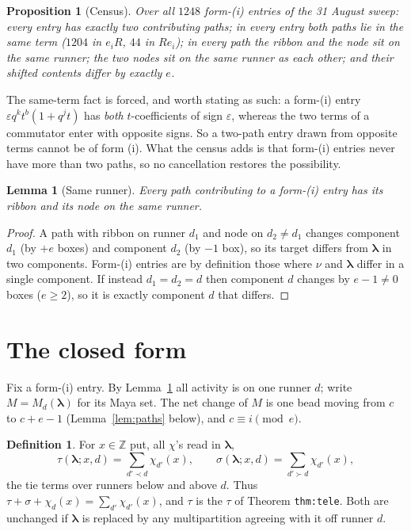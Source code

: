 \documentclass[11pt]{article}
\newtheorem{proposition}[theorem]{Proposition}
\newtheorem{lemma}[theorem]{Lemma}
\theoremstyle{definition}
\newtheorem{definition}[theorem]{Definition}
\theoremstyle{remark}
\newcommand{\Z}{\mathbb{Z}}
\newcommand{\bl}{\boldsymbol{\lambda}}
\begin{document}
\begin{proposition}[Census]\label{prop:census}
Over all $1248$ form-(i) entries of the 31 August sweep: every entry has exactly two
contributing paths; in every entry both paths lie in the same term ($1204$ in $e_iR$,
$44$ in $Re_i$); in every path the ribbon and the node sit on the same runner; the two
nodes sit on the same runner as each other; and their shifted contents differ by exactly
$e$.
\end{proposition}

The same-term fact is forced, and worth stating as such: a form-(i) entry
$\varepsilon q^{k}t^{b}(1+q^{j}t)$ has \emph{both} $t$-coefficients of sign $\varepsilon$,
whereas the two terms of a commutator enter with opposite signs. So a two-path entry
drawn from opposite terms cannot be of form (i). What the census adds is that form-(i)
entries never have more than two paths, so no cancellation restores the possibility.

\begin{lemma}[Same runner]\label{lem:samerunner}
Every path contributing to a form-(i) entry has its ribbon and its node on the same
runner.
\end{lemma}
\begin{proof}
A path with ribbon on runner $d_1$ and node on $d_2\ne d_1$ changes component $d_1$ (by
$+e$ boxes) and component $d_2$ (by $-1$ box), so its target differs from $\bl$ in two
components. Form-(i) entries are by definition those where $\nu$ and $\bl$ differ in a
single component. If instead $d_1=d_2=d$ then component $d$ changes by $e-1\ne0$ boxes
($e\ge2$), so it is exactly component $d$ that differs.
\end{proof}

\section{The closed form}\label{sec:closed}

Fix a form-(i) entry. By Lemma~\ref{lem:samerunner} all activity is on one runner $d$;
write $M=M_d(\bl)$ for its Maya set. The net change of $M$ is one bead moving from $c$
to $c+e-1$ (Lemma~\ref{lem:paths} below), and $c\equiv i \pmod e$.

\begin{definition}\label{def:sigmatau}
For $x\in\Z$ put, all $\chi$'s read in $\bl$,
\[
\tau(\bl;x,d)=\sum_{d'\prec d}\chi_{d'}(x),\qquad
\sigma(\bl;x,d)=\sum_{d'\succ d}\chi_{d'}(x),
\]
the tie terms over runners below and above $d$. Thus
$\tau+\sigma+\chi_d(x)=\sum_{d'}\chi_{d'}(x)$, and $\tau$ is the $\tau$ of
Theorem \texttt{thm:tele}. Both are unchanged if $\bl$ is replaced by any multipartition
agreeing with it off runner $d$.
\end{definition}
\end{document}
